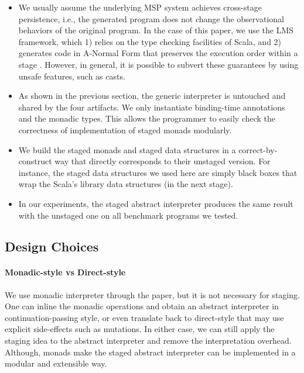 \begin{itemize}
  \item We usually assume the underlying MSP system achieves cross-stage
    persistence, i.e., the generated program does not change the observational
    behaviors of the original program. In the case of this paper, we use the
    LMS framework, which 1) relies on the type checking facilities of Scala, and
    2) generates code in A-Normal Form \cite{Flanagan:1993:ECC:155090.155113}
    that preserves the execution order within a stage \cite{DBLP:conf/birthday/Rompf16}.
    However, in general, it is possible to subvert these guarantees by
    using unsafe features, such as casts.
  \item As shown in the previous section, the generic interpreter is untouched
    and shared by the four artifacts. We only instantiate binding-time
    annotations and the monadic types. This allows the programmer to easily
    check the correctness of implementation of staged monads modularly.
  \item We build the staged monads and staged data structures in a
    correct-by-construct way that directly corresponds to their unstaged
    version. For instance, the staged data structures we used here are simply
    black boxes that wrap the Scala's library data structures (in the next
    stage).
  \item In our experiments, the staged abstract interpreter produces the same
    result with the unstaged one on all benchmark programs we tested.
\end{itemize}

\subsection{Design Choices}

\paragraph{Monadic-style vs Direct-style} We use monadic interpreter through the paper,
but it is not necessary for staging. One can inline the monadic
operations and obtain an abstract interpreter in continuation-passing
style, or even translate back to direct-style that may use explicit
side-effects such as mutations. In either case, we can still apply the
staging idea to the abstract interpreter and remove the interpretation
overhead. Although, monads make the staged abstract interpreter can be
implemented in a modular and extensible way.


